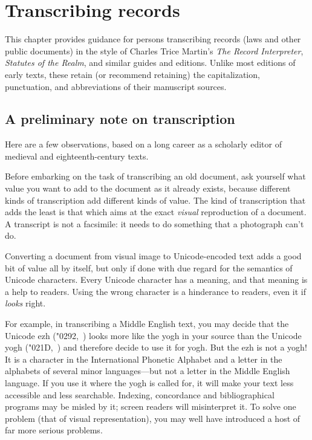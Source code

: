 \chapter{Transcribing records}

This chapter provides guidance for persons transcribing records (laws and other
public documents) in the style of Charles Trice Martin’s
\textit{The Record Interpreter}, \textit{Statutes of the Realm}, and similar guides
and editions.
Unlike most editions of early texts, these retain (or recommend retaining) the capitalization,
punctuation, and abbreviations of their manuscript sources.

\section{A preliminary note on transcription}
Here are a few observations, based on a long career as a scholarly editor of medieval and eighteenth-century texts.

Before embarking on the task of transcribing an old document, ask yourself what value you want to add to the document as
it already exists, because different kinds of transcription add different kinds of value. The kind of transcription
that adds the least is that which aims at the exact \textit{visual} reproduction of a document. A transcript is not a
facsimile: it needs to do something that a photograph can't do.

Converting a document from visual image to Unicode-encoded text adds a good bit of value all by itself, but only if done
with due regard for the semantics of Unicode characters. Every Unicode character has a meaning, and that meaning is a
help to readers. Using the wrong character is a hinderance to readers, even it if \textit{looks} right.

For example, in transcribing a Middle English text, you may decide that the Unicode ezh (\char"0292,~) looks more like
the yogh in your source than the Unicode yogh (\char"021D,~) and therefore decide to use it for yogh. But the ezh is
not a yogh! It is a character in the International Phonetic Alphabet and a letter in the alphabets of several minor
languages---but not a letter in the Middle English language. If you use it where the yogh is called for, it will make
your text less accessible and less searchable. Indexing, concordance and bibliographical programs may be misled by it;
screen readers will misinterpret it. To solve one problem (that of visual representation), you may well have introduced
a host of far more serious problems.

